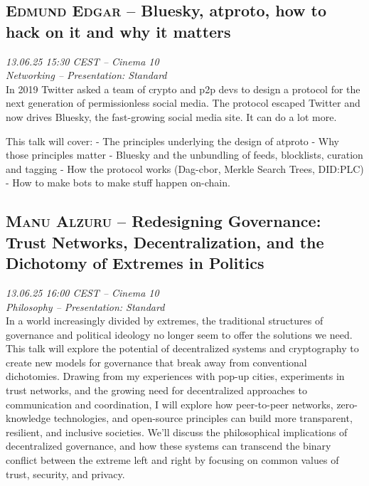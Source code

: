 \clearpage
\subsection {\textsc{Edmund Edgar}  -- Bluesky, atproto, how to hack on it and why it matters} \noindent \textit {13.06.25 15:30 CEST -- Cinema 10\\ Networking -- Presentation: Standard}\\[1em] In 2019 Twitter asked a team of crypto and p2p devs to design a protocol for the next generation of permissionless social media. The protocol escaped Twitter and now drives Bluesky, the fast-growing social media site. It can do a lot more.

This talk will cover:
 - The principles underlying the design of atproto
 - Why those principles matter
 - Bluesky and the unbundling of feeds, blocklists, curation and tagging
 - How the protocol works (Dag-cbor, Merkle Search Trees, DID:PLC)
 - How to make bots to make stuff happen on-chain.

\clearpage
\subsection {\textsc{Manu Alzuru}  -- Redesigning Governance: Trust Networks, Decentralization, and the Dichotomy of Extremes in Politics} \noindent \textit {13.06.25 16:00 CEST -- Cinema 10\\ Philosophy -- Presentation: Standard}\\[1em] In a world increasingly divided by extremes, the traditional structures of governance and political ideology no longer seem to offer the solutions we need. This talk will explore the potential of decentralized systems and cryptography to create new models for governance that break away from conventional dichotomies. Drawing from my experiences with pop-up cities, experiments in trust networks, and the growing need for decentralized approaches to communication and coordination, I will explore how peer-to-peer networks, zero-knowledge technologies, and open-source principles can build more transparent, resilient, and inclusive societies. We’ll discuss the philosophical implications of decentralized governance, and how these systems can transcend the binary conflict between the extreme left and right by focusing on common values of trust, security, and privacy.

\clearpage
